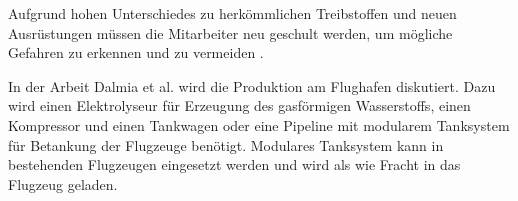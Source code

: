 Aufgrund hohen Unterschiedes zu herkömmlichen Treibstoffen und neuen Ausrüstungen müssen die Mitarbeiter neu geschult werden, 
um mögliche Gefahren zu erkennen und zu vermeiden \cite{gu2023hydrogen}.

In der Arbeit Dalmia et al. \cite{dalmia2022powering} wird die Produktion am Flughafen diskutiert. 
Dazu wird einen Elektrolyseur für Erzeugung des gasförmigen Wasserstoffs, einen Kompressor und einen Tankwagen oder
eine Pipeline mit modularem Tanksystem für Betankung der Flugzeuge benötigt. Modulares Tanksystem kann in bestehenden Flugzeugen eingesetzt werden
und wird als wie Fracht in das Flugzeug geladen. %

%
